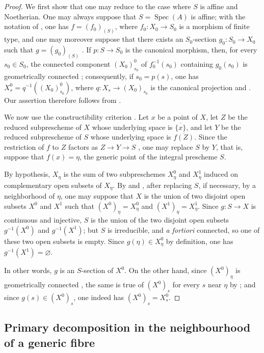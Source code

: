 \begin{proof}
We first show that one may reduce to the case where $S$ is affine and Noetherian. One may always suppose that $S=\operatorname{Spec}(A)$ is affine; with the notation of , one has $f=(f_0)_{(S)}$, where $f_0:X_0\to S_0$ is a morphism of finite type, and one may moreover suppose that there exists an $S_0$-section $g_0:S_0\to X_0$ such that $g=(g_0)_{(S)}$ . If $p:S\to S_0$ is the canonical morphism, then, for every $s_0\in S_0$, the connected component $(X_0)^0_{s_0}$ of $f_0^{-1}(s_0)$ containing $g_0(s_0)$ is geometrically connected ; consequently, if $s_0=p(s)$, one has $X_s^0=q^{-1}((X_0)^0_{s_0})$, where $q:X_s\to (X_0)_{s_0}$ is the canonical projection  and . Our assertion therefore follows from .

We now use the constructibility criterion . Let $x$ be a point of $X$, let $Z$ be the reduced subprescheme of $X$ whose underlying space is $\overline{\{x\}}$, and let $Y$ be the reduced subprescheme of $S$ whose underlying space is $\overline{f(Z)}$. Since the restriction of $f$ to $Z$ factors as $Z\to Y\to S$ , one may replace $S$ by $Y$, that is, suppose that $f(x)=\eta$, the generic point of the integral prescheme $S$.

By hypothesis, $X_\eta$ is the sum of two subpreschemes $X_\eta^0$ and $X_\eta^1$ induced on complementary open subsets of $X_\eta$. By  and , after replacing $S$, if necessary, by a neighborhood of $\eta$, one may suppose that $X$ is the union of two disjoint open subsets $X^0$ and $X^1$ such that $(X^0)_\eta=X_\eta^0$ and $(X^1)_\eta=X_\eta^1$. Since $g:S\to X$ is continuous and injective, $S$ is the union of the two disjoint open subsets $g^{-1}(X^0)$ and $g^{-1}(X^1)$; but $S$ is irreducible, and \emph{a fortiori} connected, so one of these two open subsets is empty. Since $g(\eta)\in X_\eta^0$ by definition, one has $g^{-1}(X^1)=\varnothing$.

In other words, $g$ is an $S$-section of $X^0$. On the other hand, since $(X^0)_\eta$ is geometrically connected , the same is true of $(X^0)_s$ for every $s$ near $\eta$ by ; and since $g(s)\in (X^0)_s$, one indeed has $(X^0)_s=X_s^0$.
\end{proof}

\subsection{Primary decomposition in the neighbourhood of a generic fibre}
\label{subsection:IV.9.8}
\label{IV.9.8}

